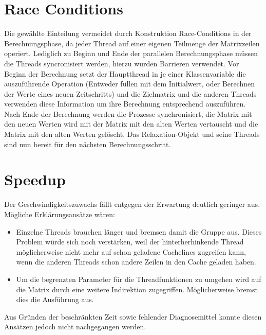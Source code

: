 \documentclass[10pt,compsoc, a4paper]{IEEEtran}
\begin{document}
\section{Race Conditions}
Die gewählte Einteilung vermeidet durch Konstruktion Race-Conditions in der Berechnungsphase, da jeder Thread auf einer eigenen Teilmenge der Matrixzeilen operiert. Lediglich zu Beginn und Ende der parallelen Berechnungsphase müssen die Threads syncronisiert werden, hierzu wurden Barrieren verwendet. Vor Beginn der Berechnung setzt der Hauptthread in je einer Klassenvariable die auszuführende Operation (Entweder füllen mit dem Initialwert, oder Berechnen der Werte eines neuen Zeitschritts) und die Zielmatrix und die anderen Threads verwenden diese Information um ihre Berechnung entsprechend auszuführen. Nach Ende der Berechnung werden die Prozesse synchronisiert, die Matrix mit den neuen Werten wird mit der Matrix mit den alten Werten vertauscht und die Matrix mit den alten Werten gelöscht. Das Relaxation-Objekt und seine Threads sind nun bereit für den nächsten Berechnungsschritt.

\section{Speedup}
Der Geschwindigkeitszuwachs fällt entgegen der Erwartung deutlich geringer aus. Mögliche Erklärungsansätze wären:
\begin{itemize}
	\item Einzelne Threads brauchen länger und bremsen damit die Gruppe aus. Dieses Problem würde sich noch verstärken, weil der hinterherhinkende Thread möglicherweise nicht mehr auf schon geladene Cachelines zugreifen kann, wenn die anderen Threads schon andere Zeilen in den Cache geladen haben.
	\item Um die begrenzten Parameter für die Threadfunktionen zu umgehen wird auf die Matrix durch eine weitere Indirektion zugegriffen. Möglicherweise bremst dies die Ausführung aus.
\end{itemize}
Aus Gründen der beschränkten Zeit sowie fehlender Diagnosemittel konnte diesen Ansätzen jedoch nicht nachgegangen werden.
\end{document}
